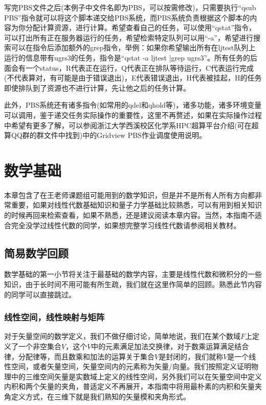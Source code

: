 \documentclass[12pt,a4paper,openany,twoside]{book}
\numberwithin{equation}{section}
\begin{document}
    写完PBS文件之后(本例子中文件名即为PBS，可以按需修改)，只需要执行“qsub PBS”指令就可以将这个脚本递交给PBS系统，而PBS系统负责根据这个脚本的内容为你分配计算资源，进行计算。希望查看自己的任务，可以使用“qstat”指令，可以打出所有正在服务器运行的任务，希望检索特定队列可以用“-a”，希望进行搜索可以在指令后添加额外的grep指令，举例：如果你希望输出所有在ljtest队列上运行的信息带有ugrs3的任务，指令是“qstat -a ljtest |grep ugrs3”。所有任务的后面会有一个status，R代表正在运行，Q代表正在排队等待运行，C代表运行完成(不代表算对，有可能是由于错误退出)，E代表错误退出，H代表被挂起，H的任务即使排队到了资源也不进行计算，先让他之后的任务计算。

    此外，PBS系统还有诸多指令(如常用的qdel和qhold等)，诸多功能，诸多环境变量可以调用，鉴于递交任务实际操作的重要性，这里不再赘述，如果在实际操作过程中希望有更多了解，可以参阅浙江大学西溪校区化学系HPC超算平台介绍(可在超算QQ群的群文件中找到)中的Gridview PBS作业调度使用说明。
    
    \chapter{数学基础}

    本章包含了在王老师课题组可能用到的数学知识，但是并不是所有人所有方向都非常重要，如果对线性代数基础知识和量子力学基础比较熟悉，可以有用到相关知识的时候再回来检索查看，如果不熟悉，还是建议阅读本章内容。当然，本指南不适合完全没学过线性代数的同学，如果想完整学习线性代数请参阅相关教材。

    \section{简易数学回顾}
    
    数学基础的第一小节将关注于最基础的数学内容，主要是线性代数和微积分的一些知识，由于长时间不用可能有所生疏，我们就在这里作简单的回顾。熟悉此节内容的同学可以直接跳过。

    \subsection{线性空间，线性映射与矩阵}

    对于矢量空间的数学定义，我们不做仔细讨论，简单地说，我们在某个数域$F$上定义了一个非空集合$V$，这个$V$中的元素满足加法交换律，对于数乘运算满足结合律，分配律等，而且数乘和加法的运算关于集合$V$是封闭的，我们就称$V$是一个线性空间，或者矢量空间，矢量空间内的元素称为矢量/向量。我们按照定义证明物理中的三维空间矢量是实数域上定义的线性空间，另外我们可以在矢量空间中定义内积和两个矢量的夹角，普适定义不再展开，本指南中将用最朴素的内积和矢量夹角定义方式，在三维下就是我们熟知的矢量模和夹角形式。
\end{document}
